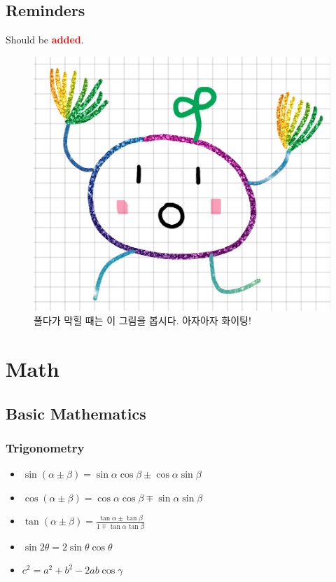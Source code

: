\documentclass[landscape, 8pt, a4paper, oneside, twocolumn]{extarticle}
\newcommand{\added}{Should be \textcolor{red}{\textbf{added}}.}
\begin{document}
\subsection*{Reminders}
\added
\begin{figure}[h]
    \centering
    \includegraphics[height=0.2\textheight]{./cheer_potato.png}
    \caption{풀다가 막힐 때는 이 그림을 봅시다. 아자아자 화이팅!}
\end{figure}

\section{Math}

\subsection{Basic Mathematics}

\subsubsection{Trigonometry}
\begin{itemize}
\item $ \sin(\alpha \pm \beta) = \sin\alpha \cos\beta \pm \cos\alpha \sin\beta $
\item $ \cos(\alpha \pm \beta) = \cos\alpha \cos\beta \mp \sin\alpha \sin\beta $
\item $ \tan(\alpha \pm \beta) = \frac{\tan\alpha \pm \tan\beta}{1 \mp \tan\alpha \tan\beta}$
\item $ \sin 2\theta = 2\sin\theta\cos\theta $
\item $ c^2 = a^2 + b^2 - 2ab\cos\gamma$
\end{itemize}
\end{document}
